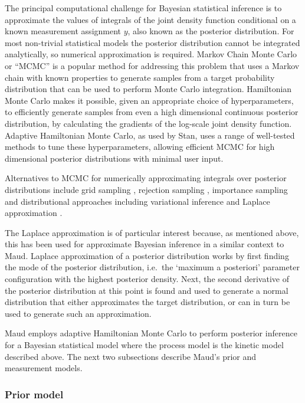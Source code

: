 \documentclass[journal=asbcd6,manuscript=article,layout=traditional]{achemso}
\begin{document}
The principal computational challenge for Bayesian statistical inference
is to approximate the values of integrals of the joint density function
conditional on a known measurement assignment \(y\), also known as the
posterior distribution. For most non-trivial statistical models the
posterior distribution cannot be integrated analytically, so numerical
approximation is required. Markov Chain Monte Carlo or ``MCMC'' is a
popular method for addressing this problem that uses a Markov chain with
known properties to generate samples from a target probability
distribution that can be used to perform Monte Carlo integration.
Hamiltonian Monte Carlo makes it possible, given an appropriate choice
of hyperparameters, to efficiently generate samples from even a high
dimensional continuous posterior distribution, by calculating the
gradients of the log-scale joint density function. Adaptive Hamiltonian
Monte Carlo, as used by Stan, uses a range of well-tested methods to
tune these hyperparameters, allowing efficient MCMC for high dimensional
posterior distributions with minimal user input.

Alternatives to MCMC for numerically approximating integrals over
posterior distributions include grid sampling \citep[ Ch.
10]{gelmanBayesianDataAnalysis2020a}, rejection sampling \citep[Ch.
10]{gelmanBayesianDataAnalysis2020a}, importance sampling
\citep{vehtariParetoSmoothedImportance2022} and distributional
approaches including variational inference and Laplace approximation
\citep[Ch. 13]{gelmanBayesianDataAnalysis2020a}.

The Laplace approximation is of particular interest because, as
mentioned above, this has been used for approximate Bayesian inference
in a similar context to Maud. Laplace approximation of a posterior
distribution works by first finding the mode of the posterior
distribution, i.e.~the `maximum a posteriori' parameter configuration
with the highest posterior density. Next, the second derivative of the
posterior distribution at this point is found and used to generate a
normal distribution that either approximates the target distribution, or
can in turn be used to generate such an approximation.

Maud employs adaptive Hamiltonian Monte Carlo to perform posterior
inference for a Bayesian statistical model where the process model is
the kinetic model described above. The next two subsections describe
Maud's prior and measurement models.

\subsubsection{Prior model}\label{prior-model}
\end{document}
